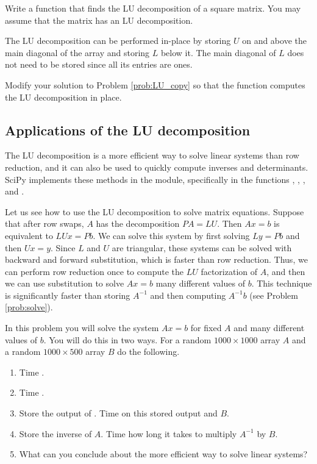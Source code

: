 \begin{problem}
\label{prob:LU_copy}
Write a function that finds the LU decomposition of a square matrix. You may assume that the matrix has an LU decomposition.
\end{problem}

The LU decomposition can be performed in-place by storing $U$ on and above the main diagonal of the array and storing $L$ below it.
The main diagonal of $L$ does not need to be stored since all its entries are ones.


\begin{problem}[Optional]
Modify your solution to Problem \ref{prob:LU_copy} so that the function computes the LU decomposition in place.
\end{problem}



\subsection*{Applications of the LU decomposition}
The LU decomposition is a more efficient way to solve linear systems than row reduction, and it can also be used to quickly compute inverses and determinants. SciPy implements these methods in the  module, specifically in the functions , , , and .

Let us see how to use the LU decomposition to solve matrix equations. 
Suppose that after row swaps, $A$ has the decomposition $PA = LU$. 
Then $Ax=b$ is equivalent to $LUx=Pb$. 
We can solve this system by first solving $Ly = Pb$ and then $Ux = y$. 
Since $L$ and $U$ are triangular, these systems can be solved with backward and forward substitution, which is faster than row reduction. 
Thus, we can perform row reduction once to compute the $LU$ factorization of $A$, and then we can use substitution to solve $Ax=b$ many different values of $b$. 
This technique is significantly faster than storing $A^{-1}$ and then computing $A^{-1}b$ (see Problem \ref{prob:solve}).

\begin{problem}\label{prob:solve}
In this problem you will solve the system $Ax = b$ for fixed $A$ and many different values of $b$. You will do this in two ways. For a random $1000 \times 1000$ array $A$ and a random $1000 \times 500$ array $B$ do the following.
\begin{enumerate}
\item Time .
\item Time .
\item Store the output of . Time  on this stored output and $B$.
\item Store the inverse of $A$. Time how long it takes to multiply $A^{-1}$ by $B$.
\item What can you conclude about the more efficient way to solve linear systems?
\end{enumerate}
\end{problem}



